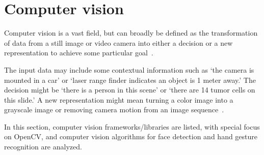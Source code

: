 %
\section{Computer vision}
\label{sec:computer-vision}
Computer vision is a vast field, but can broadly be defined as the
transformation of data from a still image or video camera into
either a decision or a new representation to achieve some particular goal~\cite{kaehler2016learning}.

The input data may include some contextual information
such as `the camera is mounted in a car' or `laser range finder indicates an
object is 1 meter away.'
The decision might be `there is a person in this scene' or `there are 14
tumor cells on this slide.'
A new representation might mean turning a color image
into a grayscale image or removing camera motion from an image
sequence~\cite{kaehler2016learning}.

In this section, computer vision frameworks/libraries are listed, with special
focus on OpenCV, and computer vision algorithms for face detection and hand
gesture recognition are analyzed.
%
%

